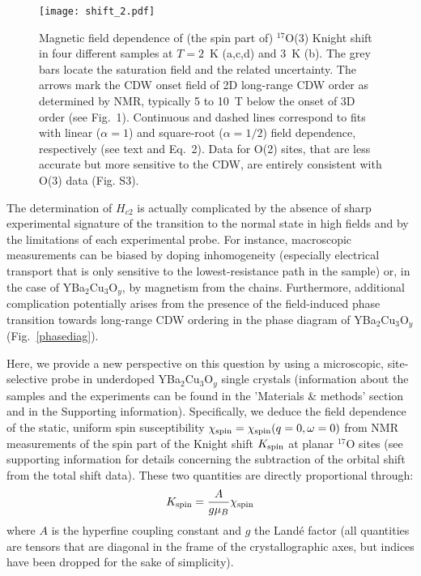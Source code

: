 \documentclass[superscriptaddress,twocolumn,prl,preprintnumbers,amsmath,amssymb]{revtex4}
\begin{document}
\begin{figure*}[t!]%
\centerline{\texttt{[image: shift\_2.pdf]}} %
 \caption{Magnetic field dependence of (the spin part of) $^{17}$O(3) Knight shift in four different samples at $T=2$~K (a,c,d) and 3~K (b). The grey bars locate the saturation field and the related uncertainty. The arrows mark the CDW onset field of 2D long-range CDW order as determined by NMR, typically 5 to 10~T below the onset of 3D order (see Fig.~1). Continuous and dashed lines correspond to fits with linear ($\alpha=1$) and square-root ($\alpha=1/2$) field dependence, respectively (see text and Eq.~2). Data for O(2) sites, that are less accurate but more sensitive to the CDW, are entirely consistent with O(3) data (Fig. S3).}
\label{shift}
\end{figure*}

The determination of $H_{c2}$ is actually complicated by the absence of sharp experimental signature of the transition to the normal state in high fields and by the limitations of each experimental probe. For instance, macroscopic measurements can be biased by doping inhomogeneity (especially electrical transport that is only sensitive to the lowest-resistance path in the sample) or, in the case of YBa$_2$Cu$_3$O$_y$, by magnetism from the chains. Furthermore, additional complication potentially arises from the presence of the field-induced phase transition towards long-range CDW ordering in the phase diagram of YBa$_2$Cu$_3$O$_y$ (Fig.~\ref{phasediag}).

Here, we provide a new perspective on this question by using a microscopic, site-selective probe in underdoped YBa$_2$Cu$_3$O$_y$ single crystals (information about the samples and the experiments can be found in the 'Materials \& methods' section and in the Supporting information). Specifically, we deduce the field dependence of the static, uniform spin susceptibility $\chi_{\rm spin} = \chi_{\rm spin}(q=0,\omega=0)$ from NMR measurements of the spin part of the Knight shift $K_{\rm spin}$ at planar $^{17}$O sites (see supporting information for details concerning the subtraction of the orbital shift from the total shift data). These two quantities are directly proportional through:
\begin{equation}
K_{\rm spin} = \frac{A}{g\mu_B} \chi_{\rm spin}
\end{equation}
where $A$ is the hyperfine coupling constant and $g$ the Land\'e factor (all quantities are tensors that are diagonal in the frame of the crystallographic axes, but indices have been dropped for the sake of simplicity).
\end{document}
